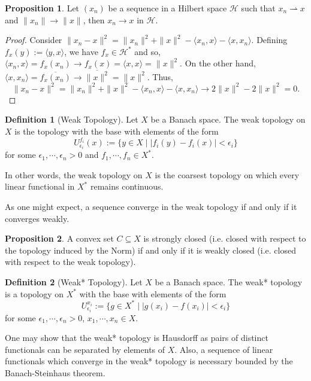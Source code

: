 \documentclass[]{article}
\theoremstyle{definition}
\theoremstyle{definition}
\newtheorem{definition}{Definition}[section]
\newtheorem{proposition}{Proposition}[section]
\newcommand{\weak}{\rightharpoonup}
\begin{document}
\begin{proposition}
  Let \((x_n)\) be a sequence in a Hilbert space \(\mathcal{H}\) such that 
  \(x_n \weak x\) and \(\|x_n\| \to \|x\|\), then \(x_n \to x\) in 
  \(\mathcal{H}\).
\end{proposition}
\begin{proof}
  Consider \(\|x_n - x\|^2 = \|x_n\|^2 + \|x\|^2 - \langle x_n, x \rangle - 
  \langle x, x_n \rangle\). Defining \(f_x(y) := \langle y, x\rangle\), 
  we have \(f_x \in \mathcal{H}^*\) and so, \(\langle x_n, x \rangle = 
  f_x(x_n) \to f_x(x) = \langle x, x\rangle = \|x\|^2\). On the other hand, 
  \(\langle x, x_n \rangle = \overline{f_x(x_n)} \to \overline{\|x\|^2} = 
  \|x\|^2\). Thus, 
  \[\|x_n - x\|^2 = \|x_n\|^2 + \|x\|^2 - \langle x_n, x \rangle - 
  \langle x, x_n \rangle \to 2\|x\|^2 - 2\|x\|^2 = 0.\]
\end{proof}

\begin{definition}[Weak Topology]
  Let \(X\) be a Banach space. The weak topology on \(X\) is the topology with 
  the base with elements of the form 
  \[U_{\epsilon_i}^{f_i}(x) := \{y \in X \mid |f_i(y) - f_i(x)| < \epsilon_i\}\]
  for some \(\epsilon_1, \cdots, \epsilon_n > 0\) and \(f_1, \cdots, f_n \in X^*\).
\end{definition}

In other words, the weak topology on \(X\) is the coarsest topology on which 
every linear functional in \(X^*\) remains continuous. 

As one might expect, a sequence converge in the weak topology if and only if 
it converges weakly.

\begin{proposition}
  A convex set \(C \subseteq X\) is strongly closed (i.e. closed with respect 
  to the topology induced by the Norm) if and only if it is weakly closed 
  (i.e. closed with respect to the weak topology).
\end{proposition}

\begin{definition}[Weak* Topology]
  Let \(X\) be a Banach space. The weak* topology is a topology on \(X^*\) 
  with the base with elements of the form 
  \[U_{\epsilon_i}^{x_i} := \{g \in X^* \mid |g(x_i) - f(x_i)| < \epsilon_i\}\]
  for some \(\epsilon_1, \cdots, \epsilon_n > 0\), \(x_1, \cdots, x_n \in X\).
\end{definition}

One may show that the weak* topology is Hausdorff as pairs of distinct 
functionals can be separated by elements of \(X\). Also, a sequence of 
linear functionals which converge in the weak* topology is necessary bounded 
by the Banach-Steinhaus theorem.
\end{document}
